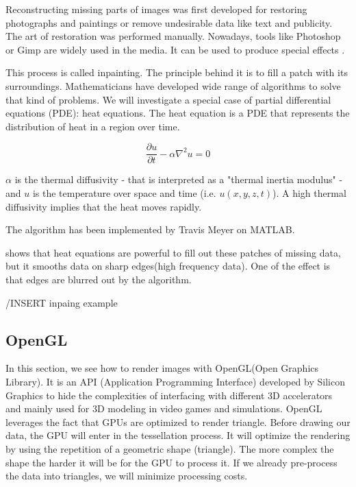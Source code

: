 Reconstructing missing parts of images was first developed for restoring photographs and paintings or remove undesirable data like text and publicity. The art of restoration was performed manually. Nowadays, tools like Photoshop or Gimp are widely used in the media. It can be used to produce special effects 
\cite{richard2001fast}.

This process is called inpainting. The principle behind it is to fill a patch with its surroundings. Mathematicians have developed wide range of algorithms to solve that kind of problems. We will investigate a special case of partial differential equations (PDE): heat equations. 
The heat equation is a PDE that represents the distribution of heat in a region over time. 

\begin{equation}\label{eqn:heateq}
\frac{\partial u}{\partial t} - \alpha \nabla^2 u = 0
\end{equation}


$\alpha$ is the thermal diffusivity - that is interpreted as a "thermal inertia modulus" - and $u$ is the temperature over space and time (i.e. $u(x,y,z,t)$). A high thermal diffusivity implies that the heat moves rapidly.

The algorithm has been implemented by Travis Meyer on MATLAB.

\cite{aubert2006mathematical} shows that heat equations are powerful to fill out these patches of missing data, but it smooths data on sharp edges(high frequency data). One of the effect is that edges are blurred out by the algorithm.

/INSERT inpaing example


\subsection{OpenGL}

In this section, we see how to render images with OpenGL(Open Graphics Library). It is an API (Application Programming Interface) developed by Silicon Graphics to hide the complexities of interfacing with different 3D accelerators and mainly used for 3D modeling in video games and simulations. OpenGL leverages the fact that GPUs are optimized to render triangle. Before drawing our data, the GPU will enter in the tessellation process. It will optimize the rendering by using the repetition of a geometric shape (triangle). The more complex the shape the harder it will be for the GPU to process it. If we already pre-process the data into triangles,  we will minimize processing costs. \cite{abobegpu}

